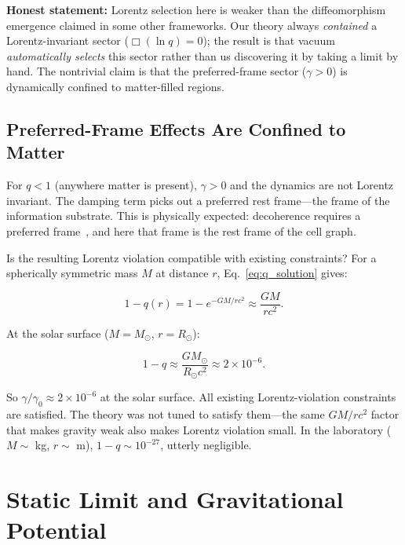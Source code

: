 \documentclass[aps,prd,twocolumn,showpacs,superscriptaddress,preprintnumbers]{revtex4-2}
\begin{document}
\textbf{Honest statement:} Lorentz selection here is weaker than the diffeomorphism emergence claimed in some other frameworks.
Our theory always \emph{contained} a Lorentz-invariant sector ($\Box(\ln q)=0$); the result is that vacuum \emph{automatically selects} this sector rather than us discovering it by taking a limit by hand.
The nontrivial claim is that the preferred-frame sector ($\gamma>0$) is dynamically confined to matter-filled regions.

\subsection{Preferred-Frame Effects Are Confined to Matter}

For $q<1$ (anywhere matter is present), $\gamma>0$ and the dynamics are not Lorentz invariant.
The damping term picks out a preferred rest frame---the frame of the information substrate.
This is physically expected: decoherence requires a preferred frame~\cite{Bassi:2013mta}, and here that frame is the rest frame of the cell graph.

Is the resulting Lorentz violation compatible with existing constraints?
For a spherically symmetric mass $M$ at distance $r$, Eq.~\eqref{eq:q_solution} gives:

\begin{equation}
1 - q(r) = 1 - e^{-GM/rc^2} \approx \frac{GM}{rc^2}.
\label{eq:lv_estimate}
\end{equation}

At the solar surface ($M=M_\odot$, $r=R_\odot$):

\begin{equation}
1 - q \approx \frac{GM_\odot}{R_\odot c^2} \approx 2 \times 10^{-6}.
\label{eq:solar_lv}
\end{equation}

So $\gamma/\gamma_0 \approx 2\times 10^{-6}$ at the solar surface.
All existing Lorentz-violation constraints~\cite{Kostelecky:2008,Mewes:2013} are satisfied.
The theory was not tuned to satisfy them---the same $GM/rc^2$ factor that makes gravity weak also makes Lorentz violation small. In the laboratory ($M\sim$ kg, $r\sim$ m), $1-q\sim 10^{-27}$, utterly negligible.

\section{Static Limit and Gravitational Potential}
\label{sec:static}
\end{document}
